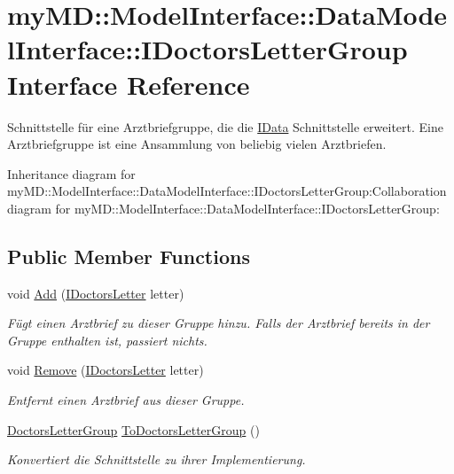 \hypertarget{interfacemy_m_d_1_1_model_interface_1_1_data_model_interface_1_1_i_doctors_letter_group}{
\section{my\-MD::Model\-Interface::Data\-Model\-Interface::IDoctors\-Letter\-Group Interface Reference}
\label{d1/df0/interfacemy_m_d_1_1_model_interface_1_1_data_model_interface_1_1_i_doctors_letter_group}
}
Schnittstelle f\"{u}r eine Arztbriefgruppe, die die \hyperlink{interfacemy_m_d_1_1_model_interface_1_1_data_model_interface_1_1_i_data}{IData} Schnittstelle erweitert. Eine Arztbriefgruppe ist eine Ansammlung von beliebig vielen Arztbriefen.  


Inheritance diagram for my\-MD::Model\-Interface::Data\-Model\-Interface::IDoctors\-Letter\-Group:Collaboration diagram for my\-MD::Model\-Interface::Data\-Model\-Interface::IDoctors\-Letter\-Group:\subsection*{Public Member Functions}
\begin{CompactItemize}
\item 
void \hyperlink{interfacemy_m_d_1_1_model_interface_1_1_data_model_interface_1_1_i_doctors_letter_group_369225fad276ca62dd1bd8f6a68ba24f}{Add} (\hyperlink{interfacemy_m_d_1_1_model_interface_1_1_data_model_interface_1_1_i_doctors_letter}{IDoctors\-Letter} letter)
\begin{CompactList}\small\item\em F\"{u}gt einen Arztbrief zu dieser Gruppe hinzu. Falls der Arztbrief bereits in der Gruppe enthalten ist, passiert nichts. \item\end{CompactList}\item 
void \hyperlink{interfacemy_m_d_1_1_model_interface_1_1_data_model_interface_1_1_i_doctors_letter_group_938bc29cf5917f270a203b621472c238}{Remove} (\hyperlink{interfacemy_m_d_1_1_model_interface_1_1_data_model_interface_1_1_i_doctors_letter}{IDoctors\-Letter} letter)
\begin{CompactList}\small\item\em Entfernt einen Arztbrief aus dieser Gruppe. \item\end{CompactList}\item 
\hyperlink{classmy_m_d_1_1_model_1_1_data_model_1_1_doctors_letter_group}{Doctors\-Letter\-Group} \hyperlink{interfacemy_m_d_1_1_model_interface_1_1_data_model_interface_1_1_i_doctors_letter_group_6135e1709db8de80bcc0241d6d99880e}{To\-Doctors\-Letter\-Group} ()
\begin{CompactList}\small\item\em Konvertiert die Schnittstelle zu ihrer Implementierung. \item\end{CompactList}\end{CompactItemize}
